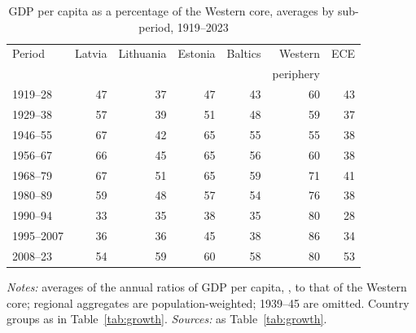\begin{table}[htbp]
\centering\footnotesize
\caption{GDP per capita as a percentage of the Western core, averages by sub-period, 1919--2023}
\label{tab:relativeavg}
\begin{threeparttable}
\begin{tabular}{lrrrrrr}
\toprule
Period & Latvia & Lithuania & Estonia & Baltics & Western & ECE \\
& & & & & periphery & \\
\midrule
1919--28 & 47 & 37 & 47 & 43 & 60 & 43 \\
1929--38 & 57 & 39 & 51 & 48 & 59 & 37 \\
\midrule
1946--55 & 67 & 42 & 65 & 55 & 55 & 38 \\
1956--67 & 66 & 45 & 65 & 56 & 60 & 38 \\
1968--79 & 67 & 51 & 65 & 59 & 71 & 41 \\
1980--89 & 59 & 48 & 57 & 54 & 76 & 38 \\
\midrule
1990--94 & 33 & 35 & 38 & 35 & 80 & 28 \\
1995--2007 & 36 & 36 & 45 & 38 & 86 & 34 \\
2008--23 & 54 & 59 & 60 & 58 & 80 & 53 \\
\bottomrule
\end{tabular}
\begin{tablenotes}
\footnotesize
\textit{Notes:} averages of the annual ratios of GDP per capita, \intlnineteen{}, to that of the Western core; regional aggregates are population-weighted; 1939--45 are omitted. Country groups as in Table~\ref{tab:growth}. \textit{Sources:} as Table~\ref{tab:growth}.
\end{tablenotes}
\end{threeparttable}
\end{table}
